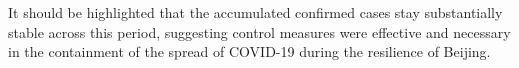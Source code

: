 \documentclass[ijgi,submit,moreauthors,pdftex]{Definitions/mdpi}
\begin{document}
It should be highlighted that the accumulated confirmed cases stay substantially stable across this period, suggesting control measures were effective and necessary in the containment of the spread of COVID-19 during the resilience of Beijing.

\begin{figure}[!ht]
    \centering
    \begin{subfigure}{.3\textwidth}
\end{subfigure}
\end{figure}
\end{document}

